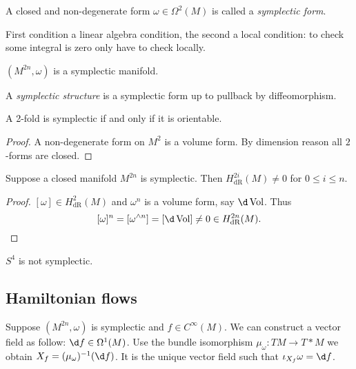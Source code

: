 \documentclass[a4paper]{article}
\newcommand{\w}{\wedge} %
\DeclareMathOperator{\Vol}{Vol} %
\begin{document}
\begin{definition}
  A closed and non-degenerate form \(\omega \in \Omega^2(M)\) is called a \emph{symplectic form}.
\end{definition}
First condition a linear algebra condition, the second a local condition: to check some integral is zero only have to check locally.

\begin{definition}
  \((M^{2n}, \omega)\) is a symplectic manifold.
\end{definition}

\begin{definition}
  A \emph{symplectic structure} is a symplectic form up to pullback by diffeomorphism.
\end{definition}

\begin{proposition}
  A 2-fold is symplectic if and only if it is orientable.
\end{proposition}

\begin{proof}
  A non-degenerate form on \(M^2\) is a volume form. By dimension reason all \(2\)-forms are closed.
\end{proof}

\begin{proposition}
  Suppose a closed manifold \(M^{2n}\) is symplectic. Then \(H^{2i}_{\text{dR}}(M) \ne 0\) for \(0 \leq i \leq n\).
\end{proposition}

\begin{proof}
  \([\omega] \in H^2_{\text{dR}}(M)\) and \(\omega^n\) is a volume form, say \(\d \Vol\). Thus
  \[
    [\omega]^n = [\omega^{\w n}] = [\d \Vol] \ne 0 \in H^{2n}_{\text{dR}}(M).
  \]
\end{proof}

\begin{eg}
  \(S^4\) is not symplectic.
\end{eg}

\subsection{Hamiltonian flows}

Suppose \((M^{2n}, \omega)\) is symplectic and \(f \in C^\infty(M)\). We can construct a vector field as follow: \(\d f \in \Omega^1(M)\). Use the bundle isomorphism \(\mu_\omega: TM \to T*M\) we obtain \(X_f = (\mu_\omega)^{-1}(\d f)\). It is the unique vector field such that \(\iota_{X_f} \omega = \d f\).
\end{document}
